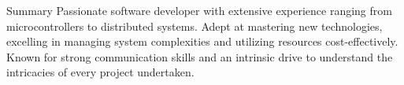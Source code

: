 \documentclass{resume} %
\begin{document}
\begin{rSection}{Summary}
Passionate software developer with extensive experience ranging from microcontrollers to distributed systems. Adept at mastering new technologies, excelling in managing system complexities and utilizing resources cost-effectively. Known for strong communication skills and an intrinsic drive to understand the intricacies of every project undertaken.
\end{rSection}

\end{document}
